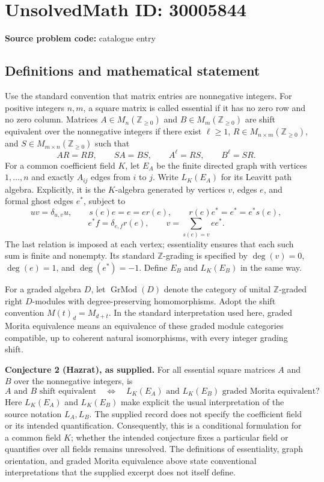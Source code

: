 \documentclass[11pt]{article}
\newcommand{\Z}{\mathbb{Z}}
\begin{document}
\section*{UnsolvedMath ID: 30005844}
\textbf{Source problem code:} catalogue entry
\subsection{Definitions and mathematical statement}
Use the standard convention that matrix entries are nonnegative integers. For positive integers \(n,m\), a square matrix is called essential if it has no zero row and no zero column. Matrices \(A\in M_n(\Z_{\geq 0})\) and \(B\in M_m(\Z_{\geq 0})\) are shift equivalent over the nonnegative integers if there exist \(\ell\geq 1\), \(R\in M_{n\times m}(\Z_{\geq 0})\), and \(S\in M_{m\times n}(\Z_{\geq 0})\) such that
\[
 AR=RB,\qquad SA=BS,\qquad A^\ell=RS,\qquad B^\ell=SR.
\]
For a common coefficient field \(K\), let \(E_A\) be the finite directed graph with vertices \(1,\ldots,n\) and exactly \(A_{ij}\) edges from \(i\) to \(j\). Write \(L_K(E_A)\) for its Leavitt path algebra. Explicitly, it is the \(K\)-algebra generated by vertices \(v\), edges \(e\), and formal ghost edges \(e^*\), subject to
\[
 uv=\delta_{u,v}u,\qquad s(e)e=e=e r(e),\qquad r(e)e^*=e^*=e^*s(e),
\]
\[
 e^*f=\delta_{e,f}r(e),\qquad
 v=\sum_{s(e)=v}ee^*.
\]
The last relation is imposed at each vertex; essentiality ensures that each such sum is finite and nonempty. Its standard \(\Z\)-grading is specified by \(\deg(v)=0\), \(\deg(e)=1\), and \(\deg(e^*)=-1\). Define \(E_B\) and \(L_K(E_B)\) in the same way.

For a graded algebra \(D\), let \(\operatorname{GrMod}(D)\) denote the category of unital \(\Z\)-graded right \(D\)-modules with degree-preserving homomorphisms. Adopt the shift convention \(M(t)_d=M_{d+t}\). In the standard interpretation used here, graded Morita equivalence means an equivalence of these graded module categories compatible, up to coherent natural isomorphisms, with every integer grading shift.

\textbf{Conjecture 2 (Hazrat), as supplied.} For all essential square matrices \(A\) and \(B\) over the nonnegative integers, is
\[
 A\text{ and }B\text{ shift equivalent}
 \quad\Longleftrightarrow\quad
 L_K(E_A)\text{ and }L_K(E_B)\text{ graded Morita equivalent}?
\]
Here \(L_K(E_A)\) and \(L_K(E_B)\) make explicit the usual interpretation of the source notation \(L_A,L_B\). The supplied record does not specify the coefficient field or its intended quantification. Consequently, this is a conditional formulation for a common field \(K\); whether the intended conjecture fixes a particular field or quantifies over all fields remains unresolved. The definitions of essentiality, graph orientation, and graded Morita equivalence above state conventional interpretations that the supplied excerpt does not itself define.
\end{document}
